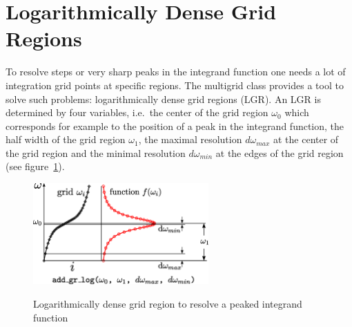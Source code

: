 \documentclass[a4paper]{scrreprt}
\begin{document}
\section{Logarithmically Dense Grid Regions}
To resolve steps or very sharp peaks in the integrand function one needs a lot of integration grid points at specific regions. The multigrid class provides a tool to solve such problems: logarithmically dense grid regions (LGR). An LGR is determined by four variables, i.e.~the center of the grid region $\omega_0$ which corresponds for example to the position of a peak in the integrand function, the half width of the grid region $\omega_1$, the maximal resolution $d\omega_{max}$ at the center of the grid region and the minimal resolution $d\omega_{min}$ at the edges of the grid region (see figure~\ref{fig:lgr}). 
\begin{figure}[h]
	\centering
	\includegraphics[width=0.6\textwidth]{pics/loggridregion.eps}
	\label{fig:lgr}
	\caption{Logarithmically dense grid region to resolve a peaked integrand function}
\end{figure}
\end{document}
